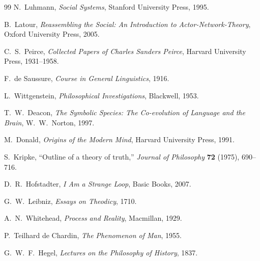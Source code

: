 \documentclass[11pt]{article}
\theoremstyle{remark}
\theoremstyle{plain}
\begin{document}
\begin{thebibliography}{99}
N.\ Luhmann,
\emph{Social Systems},
Stanford University Press, 1995.

B.\ Latour,
\emph{Reassembling the Social: An Introduction to Actor-Network-Theory},
Oxford University Press, 2005.

C.\ S.\ Peirce,
\emph{Collected Papers of Charles Sanders Peirce},
Harvard University Press, 1931--1958.

F.\ de Saussure,
\emph{Course in General Linguistics},
1916.

L.\ Wittgenstein,
\emph{Philosophical Investigations},
Blackwell, 1953.

T.\ W.\ Deacon,
\emph{The Symbolic Species: The Co-evolution of Language and the Brain},
W.\ W.\ Norton, 1997.

M.\ Donald,
\emph{Origins of the Modern Mind},
Harvard University Press, 1991.

S.\ Kripke,
``Outline of a theory of truth,''
\emph{Journal of Philosophy} \textbf{72} (1975), 690--716.

D.\ R.\ Hofstadter,
\emph{I Am a Strange Loop},
Basic Books, 2007.

G.\ W.\ Leibniz,
\emph{Essays on Theodicy},
1710.

A.\ N.\ Whitehead,
\emph{Process and Reality},
Macmillan, 1929.

P.\ Teilhard de Chardin,
\emph{The Phenomenon of Man},
1955.

G.\ W.\ F.\ Hegel,
\emph{Lectures on the Philosophy of History},
1837.

\end{thebibliography}
\end{document}
